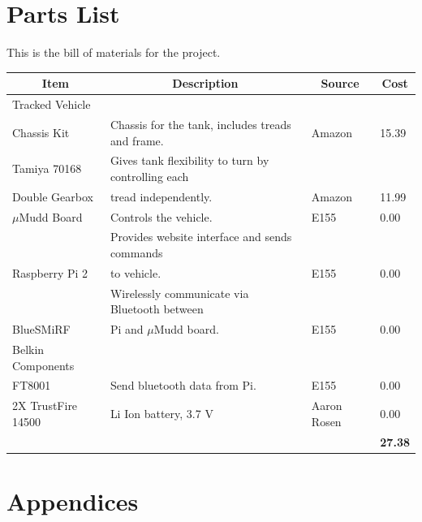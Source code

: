 \documentclass[12pt]{article}
\begin{document}
\section{Parts List}
This is the bill of materials for the project.
\begin{center}
\begin{tabular}{|l|l|l|l|}
\hline
\multicolumn{1}{|c|}{\textbf{Item}} & \multicolumn{1}{c|}{\textbf{Description}}               	& \multicolumn{1}{c|}{\textbf{Source}} & \multicolumn{1}{c|}{\textbf{Cost}} \\ \hline
Tracked Vehicle 			&										&							&	\\
			Chassis Kit	& Chassis for the tank, includes treads and frame.    	& Amazon 					& 15.39                          	\\ \hline
Tamiya 70168				& Gives tank flexibility to turn by controlling each     	& 							& \\
Double Gearbox			& tread independently.						& Amazon		               			& 11.99                             	\\ \hline
$\mu$Mudd Board                	& Controls the vehicle.                                                & E155                                 		& 0.00                               	\\ \hline
			                      	& Provides website interface and sends commands 	&							&\\
Raspberry Pi 2			    	& to vehicle.             							& E155                                 		& 0.00                               	\\ \hline
                        				& Wirelessly communicate via Bluetooth between  	&							&\\
BlueSMiRF				& Pi and $\mu$Mudd board.		 			& E155                                		& 0.00                               	\\ \hline
Belkin Components			&										&							&					\\ 
FT8001					& Send bluetooth data from Pi.					& E155                                		& 0.00                               	\\ \hline
2X TrustFire 14500			& Li Ion battery, 3.7 V 						& Aaron Rosen					& 0.00				\\ \hline
						& 										& 							& {\bf 27.38}			\\ \hline
\end{tabular}
\end{center}


\section{Appendices}


%
%
%
%
\end{document}
